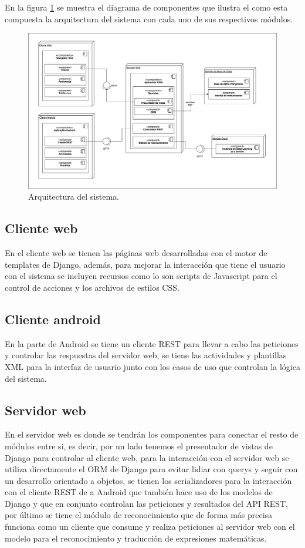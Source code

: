 En la figura \ref{fig:arquitecturaSistema} se muestra el diagrama de componentes que ilustra el como esta compuesta la arquitectura del sistema con cada uno de sus respectivos módulos.

\begin{figure}[h]
    \centering
    \includegraphics[width=\textwidth]{capitulo4/imagenes/ArquitecturaApp.jpg}
    \caption{Arquitectura del sistema.}
    \label{fig:arquitecturaSistema}
\end{figure}
\subsection{Cliente web}
En el cliente web se tienen las páginas web desarrolladas con el motor de templates de Django, además, para mejorar la interacción que tiene el usuario con el sistema se incluyen recursos como lo son scripts de Javascript para el control de acciones y los archivos de estilos CSS.
\subsection{Cliente android}
En la parte de Android se tiene un cliente REST para llevar a cabo las peticiones y controlar las respuestas del servidor web, se tiene las actividades y plantillas XML para la interfaz de usuario junto con los casos de uso que controlan la lógica del sistema.
\subsection{Servidor web}
En el servidor web es donde se tendrán los componentes para conectar el resto de módulos entre si, es decir, por un lado tenemos el presentador de vistas de Django para controlar al cliente web, para la interacción con el servidor web se utiliza directamente el ORM de Django para evitar lidiar con querys y seguir con un desarrollo orientado a objetos,  se tienen los serializadores para la interacción con el cliente REST de a Android que también hace uso de los modelos de Django y que en conjunto controlan las peticiones y resultados del API REST, por último se tiene el módulo de reconocimiento que de forma más precisa funciona como un cliente que consume y realiza peticiones al servidor web con el modelo para el reconocimiento y traducción de expresiones matemáticas.
